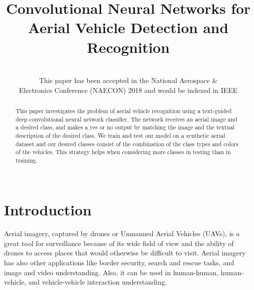 \documentclass[conference]{IEEEtran}
\begin{document}
\title{Convolutional Neural Networks for Aerial Vehicle Detection and Recognition}



\author{
\\
This paper has been accepted in the National Aerospace &\\ Electronics Conference (NAECON) 2018 and would be indexed in IEEE}






\maketitle

\begin{abstract}
This paper investigates the problem of aerial vehicle recognition using a text-guided deep convolutional neural network classifier. The network receives an aerial image and a desired class, and makes a yes or no output by matching the image and the textual description of the desired class. We train and test our model on a synthetic aerial dataset and our desired classes consist of the combination of the class types and colors of the vehicles. This strategy helps when considering more classes in testing than in training.
\\\\
\end{abstract}


\IEEEpeerreviewmaketitle



\section{Introduction}

Aerial imagery, captured by drones or Unmanned Aerial Vehicles (UAVs), is a great tool for surveillance because of its wide field of view and the ability of drones to access places that would otherwise be difficult to visit. Aerial imagery has also other applications like border security, search and rescue tasks, and image and video understanding. Also, it can be used in human-human, human-vehicle, and vehicle-vehicle interaction understanding.
\end{document}

